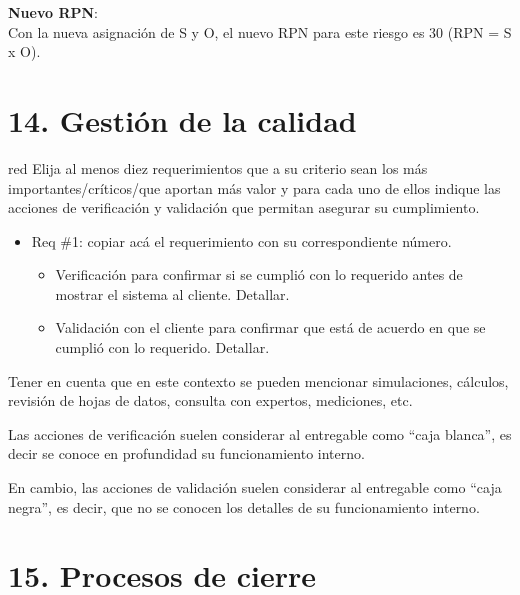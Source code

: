 \documentclass[
11pt, %
codirector, %
]{charter}
\begin{document}
\textbf{Nuevo RPN}:\\
Con la nueva asignación de S y O, el nuevo RPN para este riesgo es 30 (RPN = S x O).

\section{14. Gestión de la calidad}
\label{sec:calidad}

\begin{consigna}{red}
Elija al menos diez requerimientos que a su criterio sean los más importantes/críticos/que aportan más valor y para cada uno de ellos indique las acciones de verificación y validación que permitan asegurar su cumplimiento.

\begin{itemize} 
\item Req \#1: copiar acá el requerimiento con su correspondiente número.

\begin{itemize}
	\item Verificación para confirmar si se cumplió con lo requerido antes de mostrar el sistema al cliente. Detallar.
	\item Validación con el cliente para confirmar que está de acuerdo en que se cumplió con lo requerido. Detallar. 
\end{itemize}

\end{itemize}

Tener en cuenta que en este contexto se pueden mencionar simulaciones, cálculos, revisión de hojas de datos, consulta con expertos, mediciones, etc.  

Las acciones de verificación suelen considerar al entregable como ``caja blanca'', es decir se conoce en profundidad su funcionamiento interno.  

En cambio, las acciones de validación suelen considerar al entregable como ``caja negra'', es decir, que no se conocen los detalles de su funcionamiento interno.

\end{consigna}

\section{15. Procesos de cierre}    
\label{sec:cierre}
\end{document}
